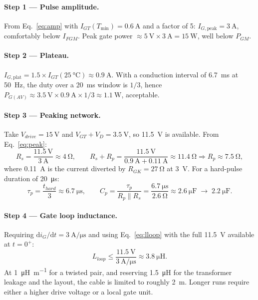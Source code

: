 \documentclass[11pt,a4paper]{article}
\begin{document}
\paragraph{Step 1 --- Pulse amplitude.}
From Eq.~\eqref{eq:amp} with $I_{GT}(T_{\min}) = \SI{0.6}{\ampere}$ and a factor of
5: $I_{G,\text{peak}} = \SI{3}{\ampere}$, comfortably below $I_{FGM}$.
Peak gate power $\approx \SI{5}{\volt}\times\SI{3}{\ampere} = \SI{15}{\watt}$,
well below $P_{GM}$.

\paragraph{Step 2 --- Plateau.}
$I_{G,\text{plat}} = 1.5\times I_{GT}(\SI{25}{\celsius}) \approx
\SI{0.9}{\ampere}$. With a conduction interval of \SI{6.7}{\milli\second} at
\SI{50}{\hertz}, the duty over a \SI{20}{\milli\second} window is $1/3$, hence
$P_{G(AV)} \approx \SI{3.5}{\volt}\times\SI{0.9}{\ampere}\times 1/3 \approx
\SI{1.1}{\watt}$, acceptable.

\paragraph{Step 3 --- Peaking network.}
Take $V_{drive} = \SI{15}{\volt}$ and $V_{GT}+V_{D} = \SI{3.5}{\volt}$, so
\SI{11.5}{\volt} is available. From Eq.~\eqref{eq:peak}:
\[
  R_s = \frac{\SI{11.5}{\volt}}{\SI{3}{\ampere}} \approx \SI{4}{\ohm},
  \qquad
  R_s + R_p = \frac{\SI{11.5}{\volt}}{\SI{0.9}{\ampere} + \SI{0.11}{\ampere}}
  \approx \SI{11.4}{\ohm} \Rightarrow R_p \approx \SI{7.5}{\ohm},
\]
where \SI{0.11}{\ampere} is the current diverted by $R_{GK} = \SI{27}{\ohm}$ at
\SI{3}{\volt}. For a hard-pulse duration of \SI{20}{\micro\second}:
\[
  \tau_p = \frac{t_{hard}}{3} \approx \SI{6.7}{\micro\second},
  \qquad
  C_p = \frac{\tau_p}{R_p \parallel R_s}
      = \frac{\SI{6.7}{\micro\second}}{\SI{2.6}{\ohm}} \approx \SI{2.6}{\micro\farad}
      \;\rightarrow\; \SI{2.2}{\micro\farad}.
\]

\paragraph{Step 4 --- Gate loop inductance.}
Requiring $\mathrm{d}i_G/\mathrm{d}t = \SI{3}{\ampere\per\micro\second}$ and using
Eq.~\eqref{eq:lloop} with the full \SI{11.5}{\volt} available at $t=0^+$:
\[
  L_{loop} \le \frac{\SI{11.5}{\volt}}{\SI{3}{\ampere\per\micro\second}}
  \approx \SI{3.8}{\micro\henry}.
\]
At \SI{1}{\micro\henry\per\metre} for a twisted pair, and reserving
\SI{1.5}{\micro\henry} for the transformer leakage and the layout, the cable is
limited to roughly \SI{2}{\metre}. Longer runs require either a higher drive
voltage or a local gate unit.
\end{document}
